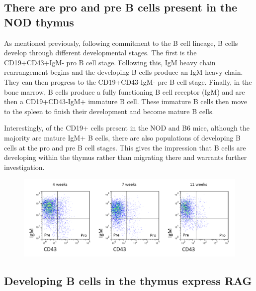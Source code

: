 \subsection{There are pro and pre B cells present in the NOD thymus}


As mentioned previously, following commitment to the B cell lineage, B cells develop through different developmental stages.
The first is the CD19+CD43+IgM- pro B cell stage.
Following this, IgM heavy chain rearrangement begins and the developing B cells produce an IgM heavy chain. 
They can then progress to the CD19+CD43-IgM- pre B cell stage.
Finally, in the bone marrow, B cells produce a fully functioning B cell receptor (IgM) and are then a CD19+CD43-IgM+ immature B cell.
These immature B cells then move to the spleen to finish their development and become mature B cells.

Interestingly, of the CD19+ cells present in the NOD and B6 mice, although the majority are mature IgM+ B cells, there are also populations of developing B cells at the pro and pre B cell stages.
This gives the impression that B cells are developing within the thymus rather than migrating there and warrants further investigation. 

\begin{figure}
	\includegraphics[width=\textwidth]{Figures/NODpropre.png}
\end{figure}




\subsection{Developing B cells in the thymus express RAG}


